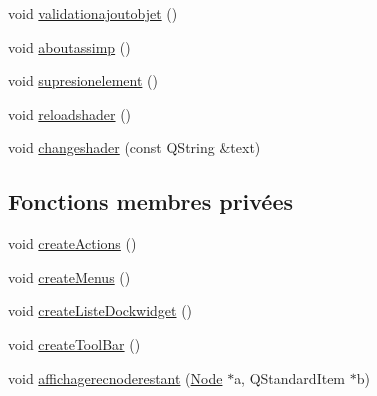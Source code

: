 \begin{DoxyCompactItemize}
\item 
void \hyperlink{class_main_window_a8b07c3898c2bb70b8de0e4f339b1d6ed}{validationajoutobjet} ()
\item 
void \hyperlink{class_main_window_aa1e4aa5c16ca9ddc7342e9ad7c162303}{aboutassimp} ()
\item 
void \hyperlink{class_main_window_a19a5bbb5908cda1ecfdf5ecd99ef0c4c}{supresionelement} ()
\item 
void \hyperlink{class_main_window_a3f652333009c5cfea551a193a3e6b350}{reloadshader} ()
\item 
void \hyperlink{class_main_window_a64e110157eb3d3143982531ec82b4983}{changeshader} (const Q\+String \&text)
\end{DoxyCompactItemize}
\subsection*{Fonctions membres privées}
\begin{DoxyCompactItemize}
\item 
void \hyperlink{class_main_window_a62cd8712fb41a754298f6f60eead2cb0}{create\+Actions} ()
\item 
void \hyperlink{class_main_window_aa4907b0251d305659e403c62921ef331}{create\+Menus} ()
\item 
void \hyperlink{class_main_window_a7b7fd06b9e7bfc83904b1d5b6503e9e9}{create\+Liste\+Dockwidget} ()
\item 
void \hyperlink{class_main_window_aeb57235ebc08860e680132db167c09b4}{create\+Tool\+Bar} ()
\item 
void \hyperlink{class_main_window_a9db31c33ce466950590bb5271412cc86}{affichagerecnoderestant} (\hyperlink{class_node}{Node} $\ast$a, Q\+Standard\+Item $\ast$b)
\end{DoxyCompactItemize}
